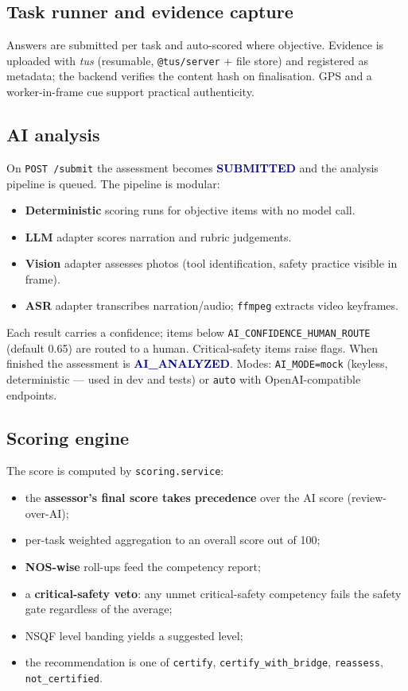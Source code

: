 \documentclass[11pt,a4paper]{article}
\newcommand{\code}[1]{\texttt{\small #1}}
\newcommand{\status}[1]{\textcolor{navy}{\textbf{#1}}}
\begin{document}
\subsection{Task runner and evidence capture}
Answers are submitted per task and auto-scored where objective. Evidence is
uploaded with \emph{tus} (resumable, \code{@tus/server} + file store) and
registered as metadata; the backend verifies the content hash on finalisation.
GPS and a worker-in-frame cue support practical authenticity.

\subsection{AI analysis}
On \code{POST /submit} the assessment becomes \status{SUBMITTED} and the
analysis pipeline is queued. The pipeline is modular:
\begin{itemize}
\item \textbf{Deterministic} scoring runs for objective items with no model
      call.
\item \textbf{LLM} adapter scores narration and rubric judgements.
\item \textbf{Vision} adapter assesses photos (tool identification, safety
      practice visible in frame).
\item \textbf{ASR} adapter transcribes narration/audio;
      \code{ffmpeg} extracts video keyframes.
\end{itemize}
Each result carries a confidence; items below
\code{AI_CONFIDENCE_HUMAN_ROUTE} (default 0.65) are routed to a human.
Critical-safety items raise flags. When finished the assessment is
\status{AI\_ANALYZED}. Modes: \code{AI_MODE=mock} (keyless, deterministic ---
used in dev and tests) or \code{auto} with OpenAI-compatible endpoints.

\subsection{Scoring engine}
The score is computed by \code{scoring.service}:
\begin{itemize}
\item the \textbf{assessor's final score takes precedence} over the AI score
      (review-over-AI);
\item per-task weighted aggregation to an overall score out of 100;
\item \textbf{NOS-wise} roll-ups feed the competency report;
\item a \textbf{critical-safety veto}: any unmet critical-safety competency
      fails the safety gate regardless of the average;
\item NSQF level banding yields a suggested level;
\item the recommendation is one of \code{certify},
      \code{certify_with_bridge}, \code{reassess}, \code{not_certified}.
\end{itemize}
\end{document}

